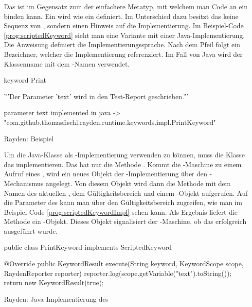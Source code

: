 Das  ist im Gegensatz zum  der einfachere Metatyp, mit welchem man Code an ein  binden kann. Ein  wird wie ein  definiert. Im Unterschied dazu besitzt das  keine Sequenz von , sondern einen Hinweis auf die Implementierung. Im Beispiel-Code \ref{prog:scriptedKeyword} sieht man eine Variante mit einer Java-Implementierung. Die Anweisung  definiert die Implementierungssprache. Nach dem Pfeil folgt ein Bezeichner, welcher die Implementierung referenziert. Im Fall von Java wird der Klassenname mit dem -Namen verwendet.

\begin{program}
\begin{JavaCode}
keyword Print {
	'''Der Parameter 'text' wird in den Test-Report geschrieben.'''
	
	parameter text
	implemented in java -> "com.github.thomasfischl.rayden.runtime.keywords.impl.PrintKeyword"
}
\end{JavaCode}
\caption{Rayden: Beispiel }
\label{prog:scriptedKeyword}
\end{program}

\SuperPar
Um die Java-Klasse als -Implementierung verwenden zu können, muss die Klasse das   implementieren. Das  hat nur die Methode . Kommt die -Maschine zu einem Aufruf eines , wird ein neues Objekt der -Implementierung über den -Mechanismus angelegt. Von diesem Objekt wird dann die Methode  mit dem Namen des aktuellen , dem Gültigkeitsbereich und einem -Objekt aufgerufen. Auf die Parameter des  kann man über den Gültigkeitsbereich zugreifen, wie man im Beispiel-Code \ref{prog:scriptedKeywordImpl} sehen kann. Als Ergebnis liefert die Methode ein -Objekt. Dieses Objekt signalisiert der -Maschine, ob das  erfolgreich ausgeführt wurde.   

\begin{program}
\begin{JavaCode}
public class PrintKeyword implements ScriptedKeyword {

	@Override
	public KeywordResult execute(String keyword, 
			KeywordScope scope, RaydenReporter reporter) {
		reporter.log(scope.getVariable("text").toString());
		return new KeywordResult(true);
	}
	
}
\end{JavaCode}
\caption{Rayden: Java-Implementierung des }
\label{prog:scriptedKeywordImpl}
\end{program}

